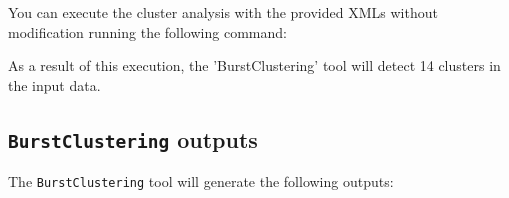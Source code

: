 \documentclass[twoside,a4,english,11pt]{book}
\begin{document}
You can execute the cluster analysis with the provided XMLs without modification
running the following command:

\begin{figure}[!h]
  

\end{figure}


As a result of this execution, the 'BurstClustering' tool will detect 14
clusters in the input data.

\subsection{\texttt{BurstClustering} outputs}

The \texttt{BurstClustering} tool will generate the following outputs:
\end{document}
